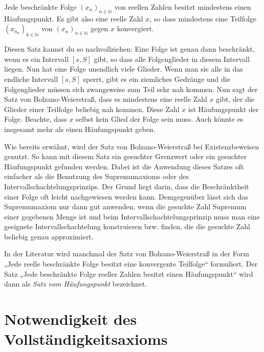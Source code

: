 \documentclass[fontsize=9pt,
               parskip=half-,
               DIV=14,
               listof=chapterentry,
               tocflat]{scrbook}
\begin{document}
\begin{theorem*}
Jede beschränkte Folge $(x_{n})_{n\in \mathbb {N} }$ von reellen Zahlen besitzt mindestens einen Häufungspunkt. Es gibt also eine reelle Zahl $x$, so dass mindestens eine Teilfolge $\left(x_{n_{k}}\right)_{k\in \mathbb {N} }$ von $(x_{n})_{n\in \mathbb {N} }$ gegen $x$ konvergiert.

\end{theorem*}

Diesen Satz kannst du so nachvollziehen: Eine Folge ist genau dann beschränkt, wenn es ein Intervall $[s,S]$ gibt, so dass alle Folgenglieder in diesem Intervall liegen. Nun hat eine Folge unendlich viele Glieder. Wenn man sie alle in das endliche Intervall $[s,S]$ sperrt, gibt es ein ziemliches Gedränge und die Folgenglieder müssen sich zwangsweise zum Teil sehr nah kommen. Nun sagt der Satz von Bolzano-Weierstraß, dass es mindestens eine reelle Zahl $x$ gibt, der die Glieder einer Teilfolge beliebig nah kommen. Diese Zahl $x$ ist Häufungspunkt der Folge. Beachte, dass $x$ selbst kein Glied der Folge sein muss. Auch könnte es insgesamt mehr als einen Häufungspunkt geben.

Wie bereits erwähnt, wird der Satz von Bolzano-Weierstraß bei Existenzbeweisen genutzt. So kann mit diesem Satz ein gesuchter Grenzwert oder ein gesuchter Häufungspunkt gefunden werden. Dabei ist die Anwendung dieses Satzes oft einfacher als die Benutzung des Supremumaxioms oder des Intervallschachtelungsprinzips. Der Grund liegt darin, dass die Beschränktheit einer Folge oft leicht nachgewiesen werden kann. Demgegenüber lässt sich das Supremumaxiom nur dann gut anwenden, wenn die gesuchte Zahl Supremum einer gegebenen Menge ist und beim Intervallschachtelungsprinzip muss man eine geeignete Intervallschachtelung konstruieren bzw. finden, die die gesuchte Zahl beliebig genau approximiert.

\begin{hint*}
In der Literatur wird manchmal der Satz von Bolzano-Weierstraß in der Form „Jede reelle beschränkte Folge besitzt eine konvergente Teilfolge“ formuliert. Der Satz „Jede beschränkte Folge reeller Zahlen besitzt einen Häufungspunkt“ wird dann als \emph{Satz vom Häufungspunkt} bezeichnet.

\end{hint*}

\section{Notwendigkeit des Vollständigkeitsaxioms}
\end{document}
